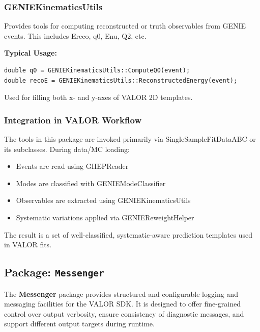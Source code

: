 \vspace{1em}
\subsubsection*{\color{cadmiumgreen}\bf GENIEKinematicsUtils}

Provides tools for computing reconstructed or truth observables from GENIE events.  
This includes {\color{amber}Ereco}, {\color{amber}q0}, {\color{amber}Enu}, {\color{amber}Q2}, etc.

\noindent\textbf{Typical Usage:}

\begin{lstlisting}
double q0 = GENIEKinematicsUtils::ComputeQ0(event);
double recoE = GENIEKinematicsUtils::ReconstructedEnergy(event);
\end{lstlisting}

Used for filling both x- and y-axes of VALOR 2D templates.

\vspace{1em}
\subsubsection*{Integration in VALOR Workflow}

The tools in this package are invoked primarily via {\color{cadmiumgreen} SingleSampleFitDataABC} or its subclasses.  
During data/MC loading:

\begin{itemize}
  \item Events are read using {\color{cadmiumgreen} GHEPReader}
  \item Modes are classified with {\color{cadmiumgreen} GENIEModeClassifier}
  \item Observables are extracted using {\color{cadmiumgreen} GENIEKinematicsUtils}
  \item Systematic variations applied via {\color{cadmiumgreen} GENIEReweightHelper}
\end{itemize}

The result is a set of well-classified, systematic-aware prediction templates used in VALOR fits.

%
%
%

\subsection{Package: \texttt{Messenger}}

The {\color{cadmiumgreen} \textbf{Messenger}} package provides structured and configurable logging and messaging facilities for the VALOR SDK.  
It is designed to offer fine-grained control over output verbosity, ensure consistency of diagnostic messages, and support different output targets during runtime.

